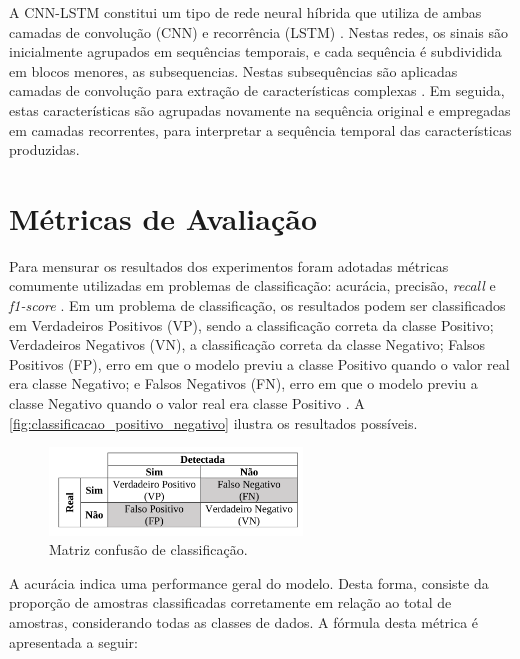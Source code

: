 A CNN-LSTM constitui um tipo de rede neural híbrida que utiliza de ambas camadas de convolução (CNN) e recorrência (LSTM) \cite{Deep2019}. Nestas redes, os sinais são inicialmente agrupados em sequências temporais, e cada sequência é subdividida em blocos menores, as subsequencias. Nestas subsequências são aplicadas camadas de convolução para extração de características complexas \cite{Deep2019}. Em seguida, estas características são agrupadas novamente na sequência original e empregadas em camadas recorrentes, para interpretar a sequência temporal das características produzidas.

\section{Métricas de Avaliação}

Para mensurar os resultados dos experimentos foram adotadas métricas comumente utilizadas em problemas de classificação: acurácia, precisão, \textit{recall} e \textit{f1-score} \cite{Rodrigues2020,Rodrigues2021,Shung2020}. Em um problema de classificação, os resultados podem ser classificados em Verdadeiros Positivos (VP), sendo a classificação correta da classe Positivo; Verdadeiros Negativos (VN), a classificação correta da classe Negativo; Falsos Positivos (FP), erro em que o modelo previu a classe Positivo quando o valor real era classe Negativo; e Falsos Negativos (FN), erro em que o modelo previu a classe Negativo quando o valor real era classe Positivo \cite{Rodrigues2020}. A \autoref{fig:classificacao_positivo_negativo} ilustra os resultados possíveis.

\begin{figure}[h]
  \centering
  \caption{Matriz confusão de classificação.}
   \label{fig:classificacao_positivo_negativo}
   \includegraphics[width=0.6\textwidth]{figuras/fig_13.png}
\end{figure}

A acurácia indica uma performance geral do modelo. Desta forma, consiste da proporção de amostras classificadas corretamente em relação ao total de amostras, considerando todas as classes de dados. A fórmula desta métrica é apresentada a seguir:

